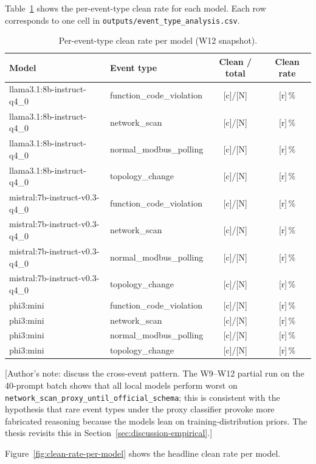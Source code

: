 Table~\ref{tab:per-event-summary} shows the per-event-type clean rate for each
model. Each row corresponds to one cell in
\texttt{outputs/event\_type\_analysis.csv}.

\begin{table}[h]
  \centering
  \caption{Per-event-type clean rate per model (W12 snapshot).}
  \label{tab:per-event-summary}
  \begin{tabular}{llcc}
    \toprule
    Model & Event type & Clean / total & Clean rate \\
    \midrule
    llama3.1:8b-instruct-q4\_0 & function\_code\_violation & [c]/[N] & [r]\,\% \\
    llama3.1:8b-instruct-q4\_0 & network\_scan & [c]/[N] & [r]\,\% \\
    llama3.1:8b-instruct-q4\_0 & normal\_modbus\_polling & [c]/[N] & [r]\,\% \\
    llama3.1:8b-instruct-q4\_0 & topology\_change & [c]/[N] & [r]\,\% \\
    \midrule
    mistral:7b-instruct-v0.3-q4\_0 & function\_code\_violation & [c]/[N] & [r]\,\% \\
    mistral:7b-instruct-v0.3-q4\_0 & network\_scan & [c]/[N] & [r]\,\% \\
    mistral:7b-instruct-v0.3-q4\_0 & normal\_modbus\_polling & [c]/[N] & [r]\,\% \\
    mistral:7b-instruct-v0.3-q4\_0 & topology\_change & [c]/[N] & [r]\,\% \\
    \midrule
    phi3:mini & function\_code\_violation & [c]/[N] & [r]\,\% \\
    phi3:mini & network\_scan & [c]/[N] & [r]\,\% \\
    phi3:mini & normal\_modbus\_polling & [c]/[N] & [r]\,\% \\
    phi3:mini & topology\_change & [c]/[N] & [r]\,\% \\
    \bottomrule
  \end{tabular}
\end{table}

[Author's note: discuss the cross-event pattern. The W9--W12 partial run on the
40-prompt batch shows that all local models perform worst on
\texttt{network\_scan\_proxy\_until\_official\_schema}; this is consistent with
the hypothesis that rare event types under the proxy classifier provoke more
fabricated reasoning because the models lean on training-distribution
priors. The thesis revisits this in Section~\ref{sec:discussion-empirical}.]

Figure~\ref{fig:clean-rate-per-model} shows the headline clean rate per model.

